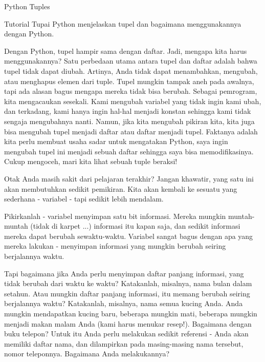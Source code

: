 \vspace{12pt}
 \hspace*{0.5in} \vspace{12pt}
Python Tuples \par
Tutorial Tupai Python menjelaskan tupel dan bagaimana menggunakannya dengan Python. \par
Dengan Python, tupel hampir sama dengan daftar. Jadi, mengapa kita harus menggunakannya? Satu perbedaan utama antara tupel dan daftar adalah bahwa tupel tidak dapat diubah. Artinya, Anda tidak dapat menambahkan, mengubah, atau menghapus elemen dari tuple. Tupel mungkin tampak aneh pada awalnya, tapi ada alasan bagus mengapa mereka tidak bisa berubah. Sebagai pemrogram, kita mengacaukan sesekali. Kami mengubah variabel yang tidak ingin kami ubah, dan terkadang, kami hanya ingin hal-hal menjadi konstan sehingga kami tidak sengaja mengubahnya nanti. Namun, jika kita mengubah pikiran kita, kita juga bisa mengubah tupel menjadi daftar atau daftar menjadi tupel. Faktanya adalah kita perlu membuat usaha sadar untuk mengatakan Python, saya ingin mengubah tupel ini menjadi sebuah daftar sehingga saya bisa memodifikasinya. Cukup mengoceh, mari kita lihat sebuah tuple beraksi! \par
Otak Anda masih sakit dari pelajaran terakhir? Jangan khawatir, yang satu ini akan membutuhkan sedikit pemikiran. Kita akan kembali ke sesuatu yang sederhana - variabel - tapi sedikit lebih mendalam. \par
\vspace{12pt}
Pikirkanlah - variabel menyimpan satu bit informasi. Mereka mungkin muntah-muntah (tidak di karpet ...) informasi itu kapan saja, dan sedikit informasi mereka dapat berubah sewaktu-waktu. Variabel sangat bagus dengan apa yang mereka lakukan - menyimpan informasi yang mungkin berubah seiring berjalannya waktu. \par
\vspace{12pt}
Tapi bagaimana jika Anda perlu menyimpan daftar panjang informasi, yang tidak berubah dari waktu ke waktu? Katakanlah, misalnya, nama bulan dalam setahun. Atau mungkin daftar panjang informasi, itu memang berubah seiring berjalannya waktu? Katakanlah, misalnya, nama semua kucing Anda. Anda mungkin mendapatkan kucing baru, beberapa mungkin mati, beberapa mungkin menjadi makan malam Anda (kami harus menukar resep!). Bagaimana dengan buku telepon? Untuk itu Anda perlu melakukan sedikit referensi - Anda akan memiliki daftar nama, dan dilampirkan pada masing-masing nama tersebut, nomor teleponnya. Bagaimana Anda melakukannya? \par

